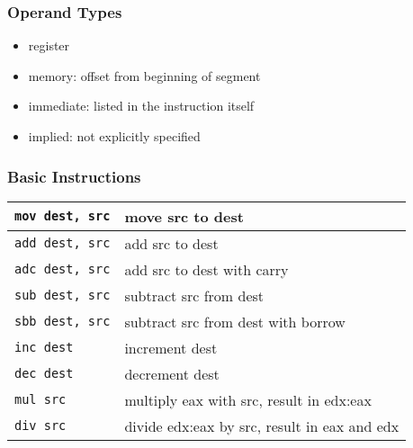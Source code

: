 \documentclass[dvipsnames]{beamer}
\begin{document}
\begin{frame}
  \frametitle{Operand Types}

  \begin{itemize}
    \item register

    \medskip
    \item memory: offset from beginning of segment

    \medskip
    \item immediate: listed in the instruction itself

    \medskip
    \item implied: not explicitly specified
  \end{itemize}
\end{frame}

\begin{frame}
  \frametitle{Basic Instructions}

  \begin{table}
    \begin{tabular}{ll}
      \lstinline|mov dest, src|
          & move src to dest\\
      \hline
      \lstinline|add dest, src|
          & add src to dest\\
      \hline
      \lstinline|adc dest, src|
          & add src to dest with carry\\
      \hline
      \lstinline|sub dest, src|
          & subtract src from dest\\
      \hline
      \lstinline|sbb dest, src|
          & subtract src from dest with borrow\\
      \hline
      \lstinline|inc dest|
          & increment dest\\
      \hline
      \lstinline|dec dest|
          & decrement dest\\
      \hline
      \lstinline|mul src|
          & multiply eax with src, result in edx:eax\\
      \hline
      \lstinline|div src|
          & divide edx:eax by src, result in eax and edx\\
    \end{tabular}
  \end{table}
\end{frame}
\end{document}
